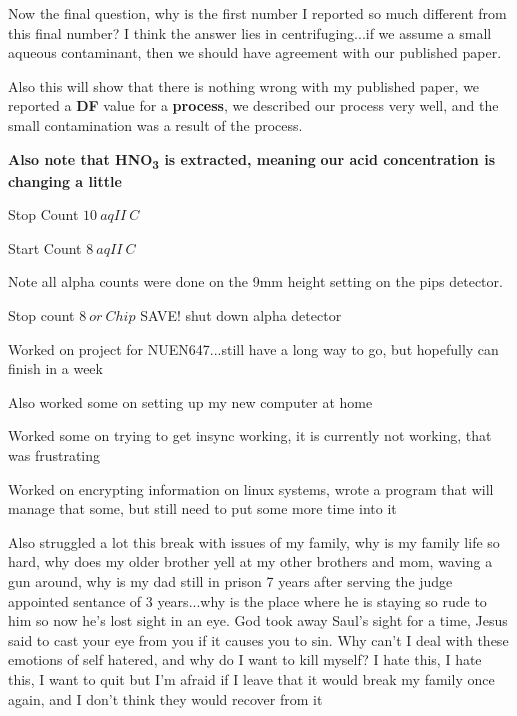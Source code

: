 \documentclass[idxtotoc,hyperref,openany,oneside]{labbook} %
\newcommand{\cmark}{\ding{51}}%
\newcommand{\done}{\rlap{$\square$}{\raisebox{2pt}{\large\hspace{1pt}\cmark}}%
  \hspace{-2.5pt}}
\newcommand{\tsbs}{\textsubscript}
\begin{document}
Now the final question, why is the first number I reported
so much different from this final number? I think the answer
lies in centrifuging...if we assume a small aqueous contaminant,
then we should have agreement with our published paper.

Also this will show that there is nothing wrong with my published
paper, we reported a \textbf{DF} value for a \textbf{process},
we described our process very well, and the small contamination
was a result of the process.

\textbf{Also note that HNO\tsbs{3} is extracted, meaning}
\textbf{our acid concentration is changing a little}



\begin{todolist}
\item[\done]{Stop Count $\boxed{10\ aqII\ C}$}
\item[\done]{Start Count $\boxed{8\ aqII\ C}$}
\end{todolist}

Note all alpha counts were done on the 9mm height setting
on the pips detector.
\begin{todolist}
\item[\done]{Stop count $\boxed{8\ or\ Chip}$ SAVE! shut down alpha
  detector}
\end{todolist}


\begin{todolist}
\item[\done]{Worked on project for NUEN647...still
  have a long way to go, but hopefully can finish in a
  week}
\item[\done]{Also worked some on setting up my new computer
  at home}
\item[\done]{Worked some on trying to get insync working,
  it is currently not working, that was frustrating}
\item[\done]{Worked on encrypting information on linux systems,
  wrote a program that will manage that some, but still need
  to put some more time into it}
\item[\done]{Also struggled a lot this break with issues of my family,
  why is my family life so hard, why does my older brother yell at
  my other brothers and mom, waving a gun around, why is my dad
  still in prison 7 years after serving the judge appointed sentance
  of 3 years...why is the place where he is staying so rude to him
  so now he's lost sight in an eye. God took away Saul's sight for a
  time, Jesus said to cast your eye from you if it causes you to sin.
  Why can't I deal with these emotions of self hatered, and why do
  I want to kill myself? I hate this, I hate this, I want to quit
  but I'm afraid if I leave that it would break my family once again,
  and I don't think they would recover from it}
\end{todolist}
\end{document}
